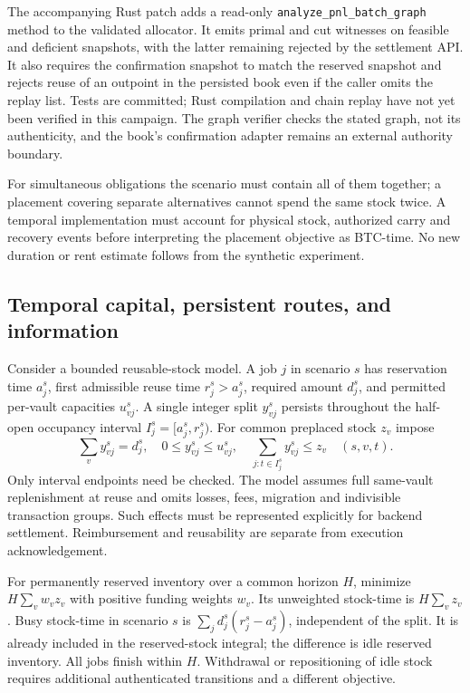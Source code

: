 The accompanying Rust patch adds a read-only \texttt{analyze\_pnl\_batch\_graph} method to the validated allocator. It emits primal and cut witnesses on feasible and deficient snapshots, with the latter remaining rejected by the settlement API. It also requires the confirmation snapshot to match the reserved snapshot and rejects reuse of an outpoint in the persisted book even if the caller omits the replay list. Tests are committed; Rust compilation and chain replay have not yet been verified in this campaign. The graph verifier checks the stated graph, not its authenticity, and the book's confirmation adapter remains an external authority boundary.

For simultaneous obligations the scenario must contain all of them together; a placement covering separate alternatives cannot spend the same stock twice. A temporal implementation must account for physical stock, authorized carry and recovery events before interpreting the placement objective as BTC-time. No new duration or rent estimate follows from the synthetic experiment.

\subsection{Temporal capital, persistent routes, and information}
\label{sec:rent-temporal}

Consider a bounded reusable-stock model. A job $j$ in scenario $s$ has reservation time $a^s_j$, first admissible reuse time $r^s_j>a^s_j$, required amount $d^s_j$, and permitted per-vault capacities $u^s_{vj}$. A single integer split $y^s_{vj}$ persists throughout the half-open occupancy interval $I^s_j=[a^s_j,r^s_j)$. For common preplaced stock $z_v$ impose
\[
 \sum_v y^s_{vj}=d^s_j,\quad
 0\le y^s_{vj}\le u^s_{vj},\quad
 \sum_{j:t\in I^s_j}y^s_{vj}\le z_v\quad(s,v,t).
\]
Only interval endpoints need be checked. The model assumes full same-vault replenishment at reuse and omits losses, fees, migration and indivisible transaction groups. Such effects must be represented explicitly for backend settlement. Reimbursement and reusability are separate from execution acknowledgement.

For permanently reserved inventory over a common horizon $H$, minimize $H\sum_v w_v z_v$ with positive funding weights $w_v$. Its unweighted stock-time is $H\sum_v z_v$. Busy stock-time in scenario $s$ is $\sum_j d^s_j(r^s_j-a^s_j)$, independent of the split. It is already included in the reserved-stock integral; the difference is idle reserved inventory. All jobs finish within $H$. Withdrawal or repositioning of idle stock requires additional authenticated transitions and a different objective.

